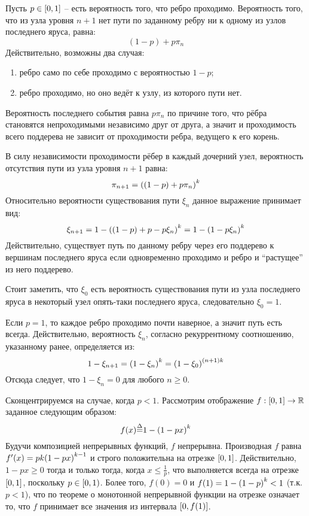 \documentclass[a4paper]{article}
\let\originalleft\left
\let\originalright\right
\renewcommand{\left}{\mathopen{}\mathclose\bgroup\originalleft}
\renewcommand{\right}{\aftergroup\egroup\originalright}
\newcommand{\clo}[1]{{\left [ #1 \right ]}}
\newcommand{\clop}[1]{{\left [ #1 \right )}}
\newcommand{\brac}[1]{{\left ( #1 \right )}}
\newcommand{\Real}{{\mathbb{R}}}
\newcommand{\defn}{{\mathop{\overset{\Delta}{=}}\nolimits}}
\begin{document}
Пусть $p\in\clo{0,1}$ -- есть вероятность того, что ребро проходимо.
Вероятность того, что из узла уровня $n+1$ нет пути по заданному ребру ни к
одному из узлов последнего яруса, равна:
\[(1-p) + p \pi_n\]
Действительно, возможны два случая:
\begin{enumerate}
	\item ребро само по себе проходимо с вероятностью $1-p$;
	\item ребро проходимо, но оно ведёт к узлу, из которого пути нет.
\end{enumerate}
Вероятность последнего события равна $p \pi_n$ по причине того, что рёбра
становятся непроходимыми независимо друг от друга, а значит и проходимость
всего поддерева не зависит от проходимости ребра, ведущего к его корень.

В силу независимости проходимости рёбер в каждый дочерний узел, вероятность
отсутствия пути из узла уровня $n+1$ равна:
\[ \pi_{n+1} = \brac{ ( 1 - p ) + p \pi_n }^k\]
Относительно вероятности существования пути $\xi_n$ данное выражение принимает
вид:
\[ \xi_{n+1} = 1 - \brac{ ( 1 - p ) + p - p \xi_n }^k = 1 - \brac{ 1 - p \xi_n }^k\]
Действительно, существует путь по данному ребру через его поддерево к вершинам
последнего яруса если одновременно проходимо и ребро и ``растущее'' из него
поддерево.

Стоит заметить, что $\xi_0$ есть вероятность существования пути из узла
последнего яруса в некоторый узел опять-таки последнего яруса, следовательно
$\xi_0 = 1$.

Если $p = 1$, то каждое ребро проходимо почти наверное, а значит путь есть
всегда. Действительно, вероятность $\xi_n$, согласно рекуррентному соотношению,
указанному ранее, определяется из:
\[1-\xi_{n+1} = \brac{ 1-\xi_n }^k = \brac{ 1-\xi_0 }^{(n+1)k}\]
Отсюда следует, что $1-\xi_n=0$ для любого $n\geq0$.

Сконцентрируемся на случае, когда $p<1$. Рассмотрим отображение
$f:\clo{0,1}\to \Real$ заданное следующим образом:
\[f(x) \defn 1 - \brac{ 1 - p x}^k\]
Будучи композицией непрерывных функций, $f$ непрерывна.
Производная $f$ равна $f'(x) = p k \brac{1 - p x}^{k-1}$ и строго положительна
на отрезке $\clo{0,1}$.
Действительно, $1 - p x\geq 0$ тогда и только тогда, когда $x\leq \frac{1}{p}$,
что выполняется всегда на отрезке $\clo{0,1}$, поскольку $p\in\clop{0,1}$.
Более того, $f(0) = 0$ и $f(1) = 1 - \brac{1-p}^k < 1$ (т.к. $p<1$), что по
теореме о монотонной непрерывной функции на отрезке означает то, что $f$
принимает все значения из интервала $\clo{0,f(1)}$.
\end{document}
